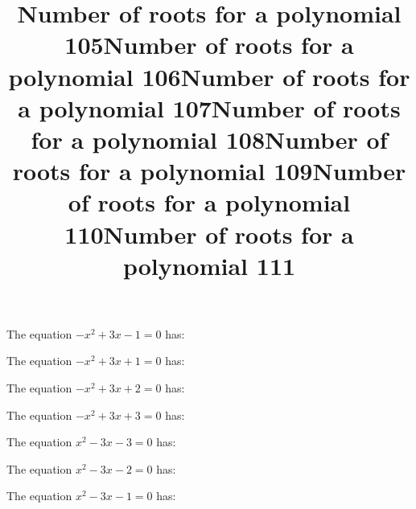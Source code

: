\documentclass{article}
\begin{document}
\begin{category}
\begin{question}[multichoice]
\end{question}
\begin{question}[multichoice]
\title{Number of roots for a polynomial 105}
The equation $- x^{2} + 3 x - 1=0$ has:



\end{question}
\begin{question}[multichoice]
\title{Number of roots for a polynomial 106}
The equation $- x^{2} + 3 x + 1=0$ has:



\end{question}
\begin{question}[multichoice]
\title{Number of roots for a polynomial 107}
The equation $- x^{2} + 3 x + 2=0$ has:



\end{question}
\begin{question}[multichoice]
\title{Number of roots for a polynomial 108}
The equation $- x^{2} + 3 x + 3=0$ has:



\end{question}
\begin{question}[multichoice]
\title{Number of roots for a polynomial 109}
The equation $x^{2} - 3 x - 3=0$ has:



\end{question}
\begin{question}[multichoice]
\title{Number of roots for a polynomial 110}
The equation $x^{2} - 3 x - 2=0$ has:



\end{question}
\begin{question}[multichoice]
\title{Number of roots for a polynomial 111}
The equation $x^{2} - 3 x - 1=0$ has:


\end{question}
\end{category}
\end{document}
